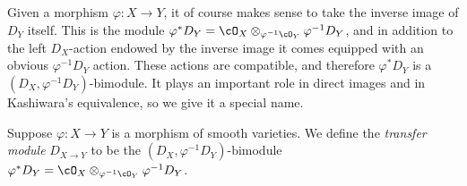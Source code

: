 Given a morphism $\varphi:X\to Y$, it of course makes sense to take the inverse image of $D_Y$ itself. This is the module $\varphi^*D_Y = \cO_X\otimes_{\varphi^{-1}\cO_Y}\varphi^{-1}D_Y$, and in addition to the left $D_X$-action endowed by the inverse image it comes equipped with an obvious $\varphi^{-1}D_Y$ action. These actions are compatible, and therefore $\varphi^*D_Y$ is a $(D_X,\varphi^{-1}D_Y)$-bimodule. It plays an important role in direct images and in Kashiwara's equivalence, so we give it a special name.
\begin{defn}\label{defn:transfer-module}
	Suppose $\varphi:X\to Y$ is a morphism of smooth varieties. We define the \emph{transfer module} $D_{X\to Y}$ to be the $(D_X,\varphi^{-1}D_Y)$-bimodule $\varphi^*D_Y = \cO_X\otimes_{\varphi^{-1}\cO_Y}\varphi^{-1}D_Y$.
\end{defn}



